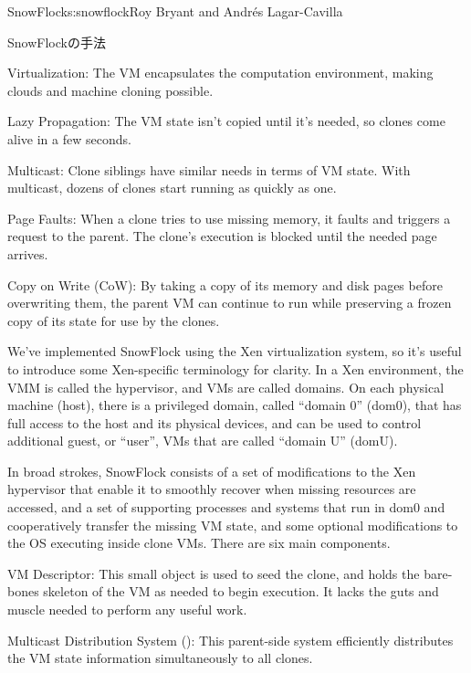 \begin{aosachapter}{SnowFlock}{s:snowflock}{Roy Bryant and Andr\'e{s} Lagar-Cavilla}
\begin{aosasect1}{SnowFlockの手法}
\begin{aosaitemize}
  \item Virtualization: The VM encapsulates the computation
  environment, making clouds and machine cloning possible.

  \item Lazy Propagation: The VM state isn't copied until it's needed,
  so clones come alive in a few seconds.

  \item Multicast: Clone siblings have similar needs in terms of VM
  state. With multicast, dozens of clones start running as quickly
  as one.

  \item Page Faults: When a clone tries to use missing memory, it
  faults and triggers a request to the parent. The clone's execution
  is blocked until the needed page arrives.

  \item Copy on Write (CoW): By taking a copy of its memory and disk
  pages before overwriting them, the parent VM can continue to run
  while preserving a frozen copy of its state for use by the clones.

\end{aosaitemize}

We've implemented SnowFlock using the Xen virtualization system, so
it's useful to introduce some Xen-specific terminology for clarity. In
a Xen environment, the VMM is called the hypervisor, and VMs are
called domains. On each physical machine (host), there is a privileged
domain, called ``domain 0'' (dom0), that has full access to the host
and its physical devices, and can be used to control additional guest, or ``user'',
VMs that are called ``domain U'' (domU).

In broad strokes, SnowFlock consists of a set of modifications to the
Xen hypervisor that enable it to smoothly recover when missing
resources are accessed, and a set of supporting processes and systems
that run in dom0 and cooperatively transfer the missing VM state, and
some optional modifications to the OS executing inside clone
VMs. There are six main components.

\begin{aosaitemize}

  \item VM Descriptor: This small object is used to seed the clone,
  and holds the bare-bones skeleton of the VM as needed to begin
  execution.  It lacks the guts and muscle needed to perform any
  useful work.

  \item Multicast Distribution System (): This
  parent-side system efficiently distributes the VM state
  information simultaneously to all clones.


\end{aosaitemize}
\end{aosasect1}
\end{aosachapter}
